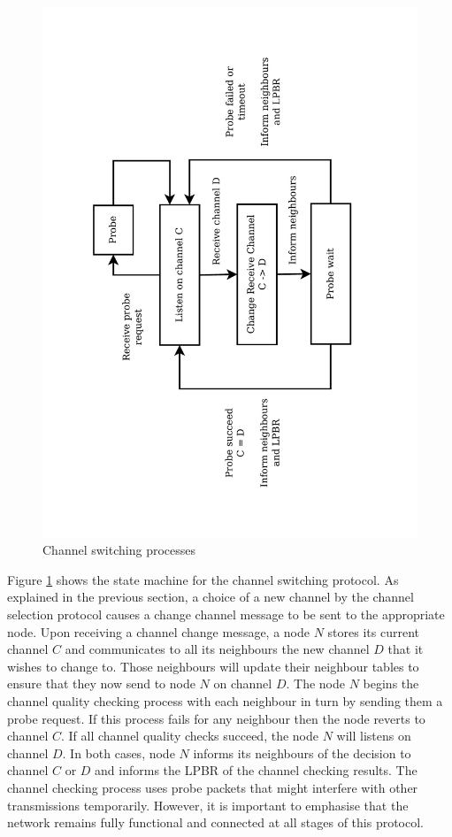 \begin{figure}
\centering
\includegraphics[trim=2cm 2cm 3cm 2cm, clip=true, totalheight=0.6\textheight, angle=270]{channelSwitching.pdf}
\caption{Channel switching processes}
\label{fig_mcrp}
\end{figure}

Figure \ref{fig_mcrp} shows the state machine for the channel switching protocol.
As explained in the previous section, a choice of a new channel by the channel selection protocol causes a change channel message to be sent to the appropriate node. 
Upon receiving a channel change message, a node $N$ stores its current channel $C$ and communicates to all its neighbours the new channel $D$ that it wishes to change to. Those neighbours will update their neighbour tables to ensure that they now send to node $N$ on channel $D$.  The node $N$ begins the channel quality checking process with each neighbour in turn by sending them a probe request. If this process fails for any neighbour then the node reverts to channel $C$. If all channel quality checks succeed, the node $N$ will listens on channel $D$. In both cases, node $N$ informs its neighbours of the decision to channel $C$ or $D$ and informs the LPBR of the channel checking results. The channel checking process uses probe packets that might interfere with other transmissions temporarily. However, it is important to emphasise that the network remains fully functional and connected at all stages of this protocol.

